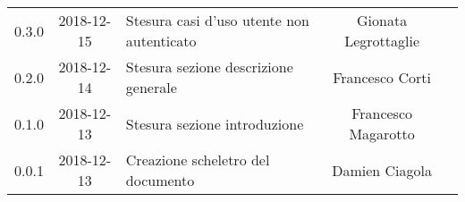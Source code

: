 {\begin{longtable}{ c c C{6cm} c c }
		0.3.0 & 
		2018-12-15 &  
		Stesura casi d'uso utente non autenticato &	
		Gionata Legrottaglie &	
		\ana{} \\
		
		0.2.0 & 
		2018-12-14 &  
		Stesura sezione descrizione generale	&	
		Francesco Corti &
		\ana{} \\
		
		0.1.0 & 
		2018-12-13 &  
		Stesura sezione introduzione &	
		Francesco Magarotto &	
		\ana{}  \\
		
		0.0.1 & 
		2018-12-13 &  
		Creazione scheletro del documento&	
		Damien Ciagola  &	
		\ana{}  \\
	\end{longtable}

}